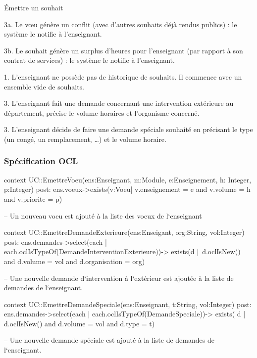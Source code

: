 \begin{usecase}{\'Emettre un souhait}
\begin{extension}
 \item [3a.] Le vœu génère un conflit (avec d'autres souhaits déjà rendus publics) : le système le notifie à l'enseignant.
 \item [3b.] Le souhait génère un surplus d'heures pour l'enseignant (par rapport à son contrat de services) : le système le notifie à l'enseignant.
\end{extension}


\begin{variation}
	\item [1.] L'enseignant ne possède pas de historique de souhaits. Il commence avec un ensemble vide de souhaits.
	\item [3.] L'enseignant fait une demande concernant une intervention extérieure au département, précise le volume horaires et l'organisme concerné.
	\item [3.] L'enseignant décide de faire une demande spéciale souhaité en précisant le type (un congé, un remplacement, \dots) et le volume horaire.
\end{variation}
\end{usecase}

\subsubsection{Spécification OCL}
\begin{ocl}
context UC::EmettreVoeu(ens:Enseignant, m:Module, e:Enseignement, h: Integer, p:Integer)
post: 
ens.voeux->exists(v:Voeu| v.enseignement = e and v.volume = h and v.priorite = p)

-- Un nouveau voeu est ajouté à la liste des voeux de l`enseignant
\end{ocl}

\begin{ocl}
context UC::EmettreDemandeExterieure(ens:Enseigant, org:String, vol:Integer)
post: 
	ens.demandes->select(each | each.oclIsTypeOf(DemandeInterventionExterieure))->
		exists(d | d.oclIsNew() and d.volume = vol and d.organisation = org)
		
-- Une nouvelle demande d`intervention à l`extérieur est ajoutée à la liste de demandes de l`enseignant.
\end{ocl}

\begin{ocl}
context UC::EmettreDemandeSpeciale(ens:Enseignant, t:String, vol:Integer)
post:
	ens.demandes->select(each | each.oclIsTypeOf(DemandeSpeciale))->
		exists( d | d.oclIsNew() and d.volume = vol and d.type = t)

-- Une nouvelle demande spéciale est ajouté à la liste de demandes de l`enseignant.
\end{ocl}


